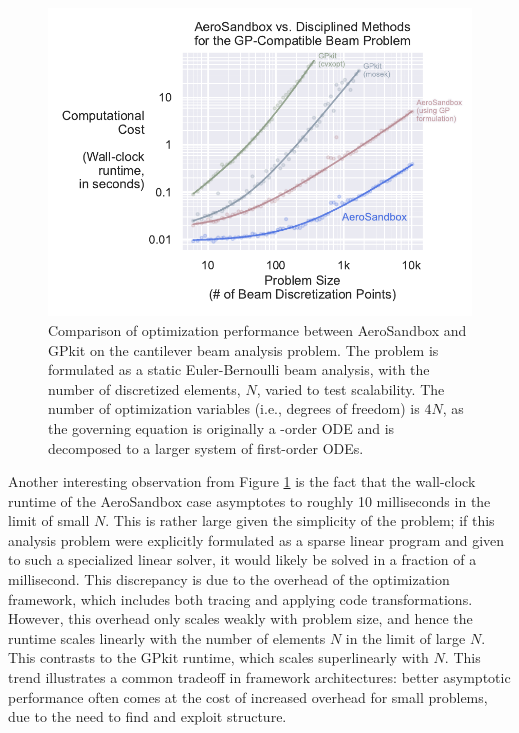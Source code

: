 \begin{figure}[h]
    \centering
    \includegraphics[width=\textwidth]{../figures/benchmark_gp_beam.pdf}
    \caption{Comparison of optimization performance between AeroSandbox and GPkit on the cantilever beam analysis problem. The problem is formulated as a static Euler-Bernoulli beam analysis, with the number of discretized elements, $N$, varied to test scalability. The number of optimization variables (i.e., degrees of freedom) is $4N$, as the governing equation is originally a -order ODE and is decomposed to a larger system of first-order ODEs.}
    \label{fig:benchmark_gp_beam}
\end{figure}

Another interesting observation from Figure \ref{fig:benchmark_gp_beam} is the fact that the wall-clock runtime of the AeroSandbox case asymptotes to roughly 10 milliseconds in the limit of small $N$. This is rather large given the simplicity of the problem; if this analysis problem were explicitly formulated as a sparse linear program and given to such a specialized linear solver, it would likely be solved in a fraction of a millisecond. This discrepancy is due to the overhead of the optimization framework, which includes both tracing and applying code transformations. However, this overhead only scales weakly with problem size, and hence the runtime scales linearly with the number of elements $N$ in the limit of large $N$. This contrasts to the GPkit runtime, which scales superlinearly with $N$. This trend illustrates a common tradeoff in framework architectures: better asymptotic performance often comes at the cost of increased overhead for small problems, due to the need to find and exploit structure.

